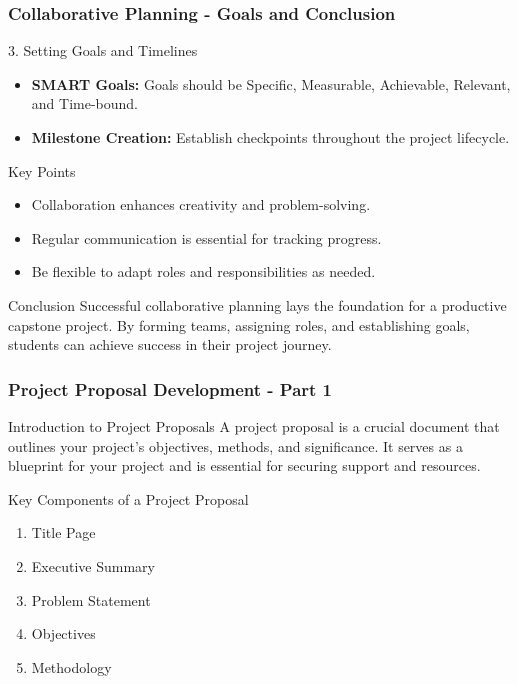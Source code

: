 \documentclass[aspectratio=169]{beamer}
\begin{document}
\begin{frame}[fragile]
    \frametitle{Collaborative Planning - Goals and Conclusion}
    \begin{block}{3. Setting Goals and Timelines}
        \begin{itemize}
            \item \textbf{SMART Goals:} Goals should be Specific, Measurable, Achievable, Relevant, and Time-bound.
            \item \textbf{Milestone Creation:} Establish checkpoints throughout the project lifecycle.
        \end{itemize}
    \end{block}

    \begin{block}{Key Points}
        \begin{itemize}
            \item Collaboration enhances creativity and problem-solving.
            \item Regular communication is essential for tracking progress.
            \item Be flexible to adapt roles and responsibilities as needed.
        \end{itemize}
    \end{block}

    \begin{block}{Conclusion}
        Successful collaborative planning lays the foundation for a productive capstone project. By forming teams, assigning roles, and establishing goals, students can achieve success in their project journey.
    \end{block}
\end{frame}

\begin{frame}[fragile]
    \frametitle{Project Proposal Development - Part 1}
    \begin{block}{Introduction to Project Proposals}
        A project proposal is a crucial document that outlines your project's objectives, methods, and significance. It serves as a blueprint for your project and is essential for securing support and resources.
    \end{block}
    
    \begin{block}{Key Components of a Project Proposal}
        \begin{enumerate}
            \item Title Page
            \item Executive Summary
            \item Problem Statement
            \item Objectives
            \item Methodology
        \end{enumerate}
    \end{block}
\end{frame}
\end{document}
